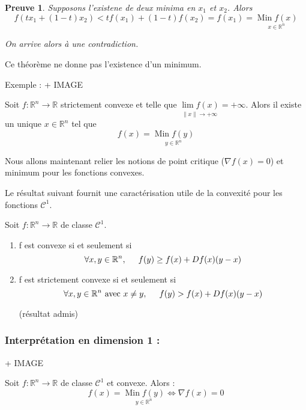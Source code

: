 \documentclass[a4paper,11pt]{article}
\newcommand{\R}{\mathbb{R}}
\newcommand{\norm}[1]{\left\lVert#1\right\rVert}
\newcommand{\deffonc}[3]{#1 : #2 \longrightarrow #3}
\DeclareMathOperator{\Min}{Min}
\theoremstyle{plain} %
\newtheorem{preuve}{Preuve}
\begin{document}
\begin{preuve}
    Supposons l'existene de deux minima en $x_1$ et $x_2$. Alors 
    \[
        f(tx_1 + (1-t)x_2) < tf(x_1) + (1-t) f(x_2) = f(x_1) = \underset{x \in \R^n}{\Min f(x)}
    \]

    On arrive alors à une contradiction.
\end{preuve}

\begin{remark}
    Ce théorème ne donne pas l'existence d'un minimum.

    Exemple :
    + IMAGE
\end{remark}

\begin{ftheo}
    Soit $\deffonc{f}{\R^n}{\R}$ strictement convexe et telle que $\underset{\norm{x} \longrightarrow +\infty}{\lim f(x)} = +\infty$. Alors il existe un unique $x \in \R^n$ tel que
    \[
        f(x) = \underset{y \in \R^n}{\Min f(y)}
    \]
\end{ftheo}

Nous allons maintenant relier les notions de point critique ($\nabla f(x) = 0$) et minimum
pour les fonctions convexes.

Le résultat suivant fournit une caractérisation utile de la convexité pour les fonctions
$\mathcal{C}^1$.

\begin{lemme}
    Soit $\deffonc{f}{\R^n}{\R}$ de classe $\mathcal{C}^1$.
    \begin{enumerate}[label=•]
        \item f est convexe si et seulement si 
            \[
                \forall x,y \in \R^n, \hspace{0.5cm} f(y) \geq f(x) + Df(x)(y-x)
            \]
        \item f est strictement convexe si et seulement si
            \[
                \forall x,y \in \R^n \text{ avec } x \ne y, \hspace{0.5cm} f(y) > f(x) + Df(x)(y-x)
            \]

            (résultat admis)
    \end{enumerate}
\end{lemme}

\subsubsection*{Interprétation en dimension 1 :}
+ IMAGE

\begin{ftheo}
    Soit $\deffonc{f}{\R^n}{\R}$ de classe $\mathcal{C}^1$ et convexe. Alors :
    \[
        f(x) = \underset{y \in \R^n}{\Min f(y)} \iff \nabla f(x) = 0
    \]
\end{ftheo}
\end{document}
